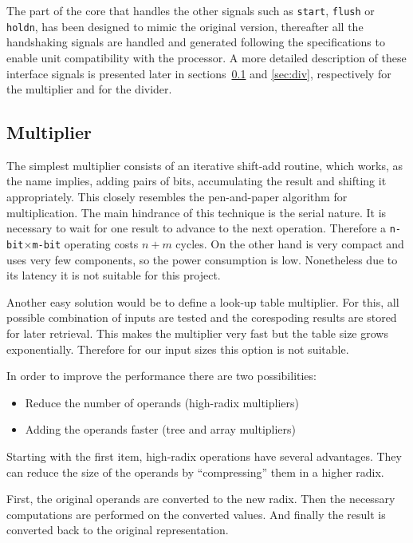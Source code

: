 The part of the core that handles the other signals such as \texttt{start}, \texttt{flush} or \texttt{holdn}, has been designed
to mimic the original version, thereafter all the handshaking signals are handled and generated following the
specifications to enable unit compatibility with the processor.
A more detailed description of these interface signals is presented later in sections~\ref{sec:mul} and \ref{sec:div}, respectively for the multiplier and for the divider.


\subsection{Multiplier}
\label{sec:mul}

The simplest multiplier consists of an iterative shift-add routine, which works, as the name implies, adding pairs of bits, accumulating the result and shifting it appropriately. This closely resembles the pen-and-paper algorithm for multiplication. The main hindrance of this technique is the serial nature. It is necessary to wait for one result to advance to the next operation. Therefore a \texttt{n-bit$\times$m-bit} operating costs $n+m$ cycles. On the other hand is very compact and uses very few components, so the power consumption is low. Nonetheless due to its latency it is not suitable for this project.

Another easy solution would be to define a look-up table multiplier. For this, all possible combination of inputs are tested and the corespoding results are stored for later retrieval. This makes the multiplier very fast but the table size grows exponentially. Therefore for our input sizes this option is not suitable.

In order to improve the performance there are two possibilities:
\begin{itemize}
\item Reduce the number of operands (\ie high-radix multipliers)
\item Adding the operands faster (\ie tree and array multipliers)
\end{itemize}

Starting with the first item, high-radix operations have several advantages.
They can reduce the size of the operands by ``compressing'' them in a higher radix.

First, the original operands are converted to the new radix. Then the necessary computations are performed on the converted values. And finally the result is converted back to the original representation.

